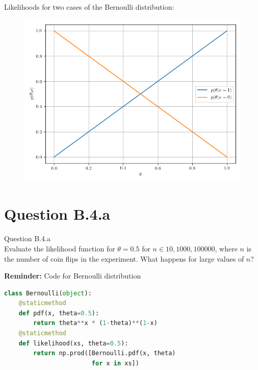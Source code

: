 \documentclass[usenames,dvipsnames,table]{beamer}
\begin{document}
\begin{frame}
Likelihoods for two cases of the Bernoulli distribution:
\begin{figure}
\centering
\includegraphics[height=0.8\textheight]{img/ex3B3.png}
\end{figure}
\end{frame}









\section{Question B.4.a}
\begin{frame}
\begin{center}
{\huge{Question B.4.a}}
\\\vspace{2em}
Evaluate the likelihood function for $\theta=0.5$ for $n \in {10, 1000, 100000}$, where $n$ is the number of coin flips in the experiment. What happens for large values of $n$?
\end{center}
\end{frame}

\begin{frame}[fragile]
\textbf{Reminder:} Code for Bernoulli distribution
\begin{lstlisting}[language=Python]
class Bernoulli(object):
    @staticmethod
    def pdf(x, theta=0.5):
        return theta**x * (1-theta)**(1-x)
    @staticmethod
    def likelihood(xs, theta=0.5):
        return np.prod([Bernoulli.pdf(x, theta)
                        for x in xs])
\end{lstlisting}
\end{frame}
\end{document}
